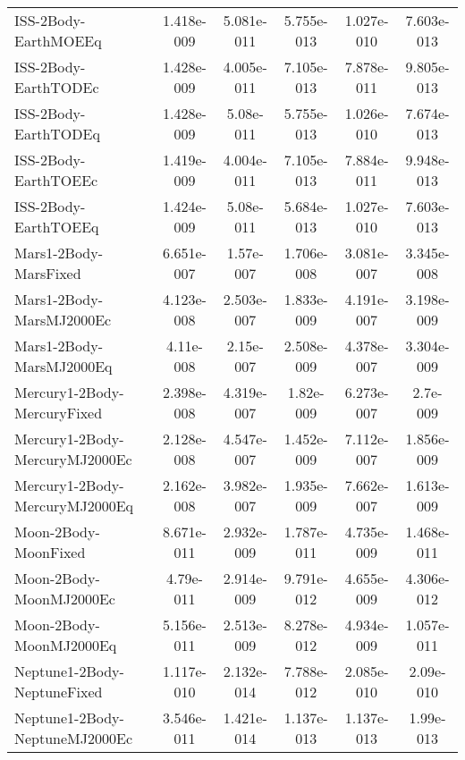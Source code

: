 \begin{table}[htbp!]
\begin{tabular}{lccccc}
         ISS-2Body-EarthMOEEq & 1.418e-009 & 5.081e-011 & 5.755e-013 & 1.027e-010 & 7.603e-013 \\
         ISS-2Body-EarthTODEc & 1.428e-009 & 4.005e-011 & 7.105e-013 & 7.878e-011 & 9.805e-013 \\
         ISS-2Body-EarthTODEq & 1.428e-009 & 5.08e-011 & 5.755e-013 & 1.026e-010 & 7.674e-013 \\
         ISS-2Body-EarthTOEEc & 1.419e-009 & 4.004e-011 & 7.105e-013 & 7.884e-011 & 9.948e-013 \\
         ISS-2Body-EarthTOEEq & 1.424e-009 & 5.08e-011 & 5.684e-013 & 1.027e-010 & 7.603e-013 \\
         Mars1-2Body-MarsFixed & 6.651e-007 & 1.57e-007 & 1.706e-008 & 3.081e-007 & 3.345e-008 \\
         Mars1-2Body-MarsMJ2000Ec & 4.123e-008 & 2.503e-007 & 1.833e-009 & 4.191e-007 & 3.198e-009 \\
         Mars1-2Body-MarsMJ2000Eq & 4.11e-008 & 2.15e-007 & 2.508e-009 & 4.378e-007 & 3.304e-009 \\
         Mercury1-2Body-MercuryFixed & 2.398e-008 & 4.319e-007 & 1.82e-009 & 6.273e-007 & 2.7e-009 \\
         Mercury1-2Body-MercuryMJ2000Ec & 2.128e-008 & 4.547e-007 & 1.452e-009 & 7.112e-007 & 1.856e-009 \\
         Mercury1-2Body-MercuryMJ2000Eq & 2.162e-008 & 3.982e-007 & 1.935e-009 & 7.662e-007 & 1.613e-009 \\
         Moon-2Body-MoonFixed & 8.671e-011 & 2.932e-009 & 1.787e-011 & 4.735e-009 & 1.468e-011 \\
         Moon-2Body-MoonMJ2000Ec & 4.79e-011 & 2.914e-009 & 9.791e-012 & 4.655e-009 & 4.306e-012 \\
         Moon-2Body-MoonMJ2000Eq & 5.156e-011 & 2.513e-009 & 8.278e-012 & 4.934e-009 & 1.057e-011 \\
         Neptune1-2Body-NeptuneFixed & 1.117e-010 & 2.132e-014 & 7.788e-012 & 2.085e-010 & 2.09e-010 \\
         Neptune1-2Body-NeptuneMJ2000Ec & 3.546e-011 & 1.421e-014 & 1.137e-013 & 1.137e-013 & 1.99e-013 \\

\end{tabular}
\end{table}

